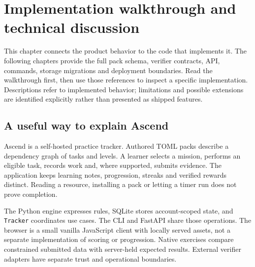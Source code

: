 \section{Implementation walkthrough and technical discussion}
\label{implementation-walkthrough}
This chapter connects the product behavior to the code that implements it.
The following chapters provide the full pack schema, verifier contracts, API,
commands, storage migrations and deployment boundaries. Read the walkthrough
first, then use those references to inspect a specific implementation. Descriptions
refer to implemented behavior; limitations and possible extensions are identified
explicitly rather than presented as shipped features.

\subsection{A useful way to explain Ascend}
Ascend is a self-hosted practice tracker. Authored TOML packs describe a dependency
graph of tasks and levels. A learner selects a mission, performs an eligible task,
records work and, where supported, submits evidence. The application keeps learning
notes, progression, streaks and verified rewards distinct. Reading a resource,
installing a pack or letting a timer run does not prove completion.

The Python engine expresses rules, SQLite stores account-scoped state, and
\texttt{Tracker} coordinates use cases. The CLI and FastAPI share those operations.
The browser is a small vanilla JavaScript client with locally served assets, not
a separate implementation of scoring or progression. Native exercises compare
constrained submitted data with server-held expected results. External verifier
adapters have separate trust and operational boundaries.

